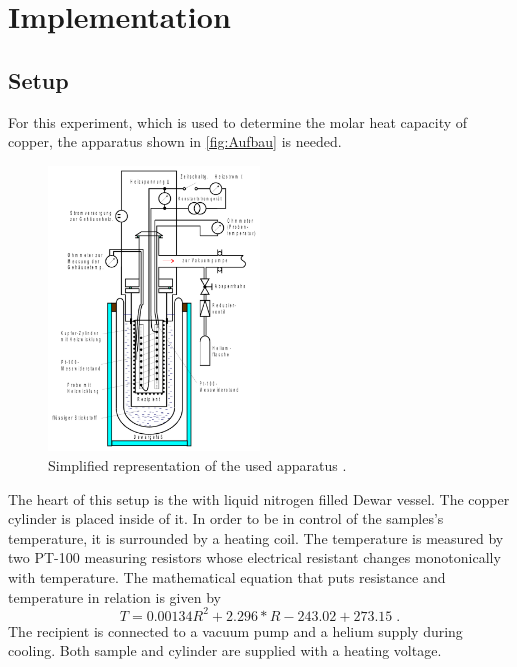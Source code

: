 \section{Implementation}
\label{sec:Aufbau}

\subsection{Setup}
For this experiment, which is used to determine the molar heat capacity of copper, the apparatus shown in \autoref{fig:Aufbau} is needed.
\begin{figure}
    \centering
        \includegraphics[width=0.5\textwidth]{Aufbau.pdf}
        \caption{Simplified representation of the used apparatus \cite{ap47}.}
        \label{fig:Aufbau}
\end{figure}
The heart of this setup is the with liquid nitrogen filled Dewar vessel. The copper cylinder is placed inside of it. In order to be in control of the samples's temperature, it is surrounded by a heating coil.
The temperature is measured by two PT-100 measuring resistors whose electrical resistant changes monotonically with temperature.
The mathematical equation that puts resistance and temperature in relation is given by 
\begin{equation*}
    T=0.00134 R^2+2.296*R-243.02+ 273.15\; . 
\end{equation*}
The recipient is connected to a vacuum pump and a helium supply during cooling. Both sample and cylinder are supplied with a heating voltage.


